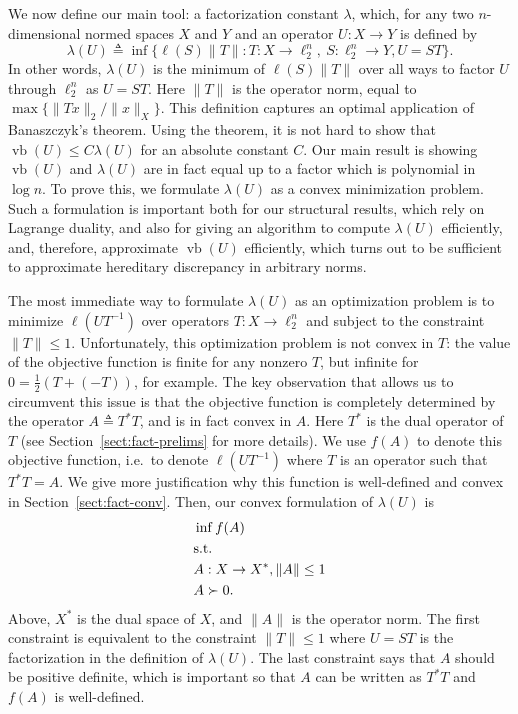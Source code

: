 \documentclass[11pt]{article}
\newcommand{\eqdef}{\triangleq}
\DeclareMathOperator{\vb}{vb}
\begin{document}
We now define our main tool: a factorization constant $\lambda$, which, for any
two $n$-dimensional normed spaces $X$ and $Y$ and an operator $U:X \to
Y$ is defined by
\[
\lambda(U) \eqdef \inf \{\ell(S)\|T\|: T: X \to \ell_2^n,\ S: \ell_2^n
\to Y, U = ST\}.
\]
In other words, $\lambda(U)$ is the minimum of $\ell(S)\|T\|$ over all
ways to factor $U$ through $\ell_2^n$ as $U = ST$. Here $\|T\|$ is the
operator norm, equal to $\max\{{\|Tx\|_2}/{\|x\|_X}\}$. 
This definition
captures an optimal application of Banaszczyk's
theorem. Using the theorem, it is not hard to show that $\vb(U) \le
C\lambda(U)$ for an absolute constant $C$. Our main result is showing
$\vb(U)$ and $\lambda(U)$ are in fact equal up to a factor which is
polynomial in $\log n$. To prove this, we formulate $\lambda(U)$ as a
convex minimization problem. Such a formulation is important both for
our structural results, which rely on Lagrange duality, and also for
giving an algorithm to compute $\lambda(U)$ efficiently, and,
therefore, approximate $\vb(U)$ efficiently, which turns out to be
sufficient to approximate hereditary discrepancy in arbitrary norms.

The most immediate way to formulate $\lambda(U)$ as an optimization
problem is to minimize $\ell(UT^{-1})$ over operators $T:X \to
\ell_2^n$ and subject to the constraint $\|T\|\le 1$.
Unfortunately, this optimization problem is not convex in $T$: the
value of the objective function is finite for any nonzero $T$, but
infinite for $0 = \frac12(T + (-T))$, for example. The key observation
that allows us to circumvent this issue is that the objective function
is completely determined by the operator $A \eqdef T^*T$, and is in
fact convex in $A$. Here $T^*$ is the dual operator of $T$ (see
Section~\ref{sect:fact-prelims} for more details). We use $f(A)$ to
denote this objective function, i.e.~to denote $\ell(UT^{-1})$ where
$T$ is an operator such that $T^*T = A$. We give more justification
why this function is well-defined and convex in
Section~\ref{sect:fact-conv}. Then, our convex formulation of
$\lambda(U)$ is
\begin{align*}
  &\inf  f(A) \\
  &\text{s.t.}\notag\\
  &A: X \to X^*,\|A\| \le 1\\
  &A \succ 0.
\end{align*}
Above, $X^*$ is the dual space of $X$, and $\|A\|$ is the operator
norm. The first constraint is equivalent to the constraint $\|T\|\le
1$ where $U = ST$ is the factorization in the definition of
$\lambda(U)$. The last constraint says that $A$ should be positive
definite, which is important so that $A$ can be written as $T^*T$ and
$f(A)$ is well-defined. 
\end{document}
